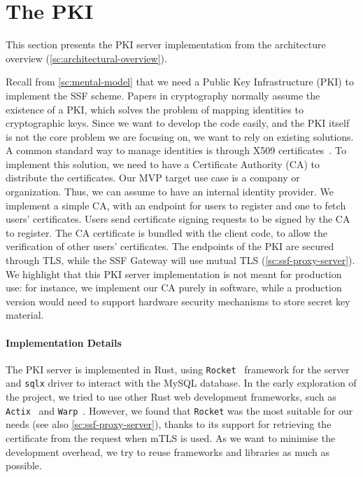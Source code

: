 \section{The PKI}\label{sc:PKI}

This section presents the PKI server implementation from the architecture overview (\cref{sc:architectural-overview}).

Recall from \cref{sc:mental-model} that
we need a Public Key Infrastructure (PKI) to implement the SSF scheme.
Papers in cryptography normally assume the existence of a PKI,
which solves the problem of mapping identities to cryptographic keys.
Since we want to develop the code easily, and the PKI itself
is not the core problem we are focusing on, we want to rely on existing
solutions.
A common standard way to manage identities is through X509 certificates~\cite{rfc5280}.
To implement this solution, we need to have a Certificate Authority (CA)
to distribute the certificates.
Our MVP target use case is a company or organization. 
Thus, we can assume to have an internal identity provider.
We implement a simple CA, with an endpoint for users
to register and one to fetch users' certificates. 
Users send certificate signing requests to be signed by the CA to register.
The CA certificate is bundled with the client code, to
allow the verification of other users' certificates.
The endpoints of the PKI are secured through TLS,
while the SSF Gateway will use mutual TLS (\cref{sc:ssf-proxy-server}).
We highlight that this PKI server implementation is not meant for production use:
for instance, we implement our CA purely in software, while a production
version would need to support hardware security mechanisms to
store secret key material.


\paragraph{Implementation Details} 
The PKI server is implemented in Rust, using \texttt{Rocket}~\cite{Rocket}
framework for the server and \texttt{sqlx} driver to interact
with the MySQL database.
In the early exploration of the project, we tried
to use other Rust web development frameworks,
such as \texttt{Actix}~\cite{Actix} and \texttt{Warp}~\cite{Warp}.
However, we found that \texttt{Rocket} was the most
suitable for our needs (see also \cref{sc:ssf-proxy-server}),
thanks to its support for retrieving the certificate
from the request when mTLS is used.
As we want to minimise the development overhead, we
try to reuse frameworks and libraries as much as possible. 

